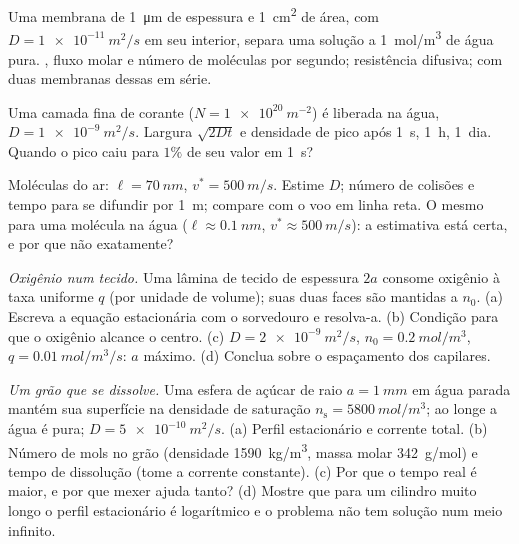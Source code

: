 \begin{exercise}[$\star$]\label{exo:b2:particle-diffusion:2}
Uma membrana de \qty{1}{\micro m} de espessura e \qty{1}{cm^2} de área, com $D =
\qty{1e-11}{m^2/s}$ em seu interior, separa uma solução a \qty{1}{mol/m^3}
de água pura. , fluxo molar e número de moléculas
por segundo; resistência difusiva; com duas membranas dessas em série.
\end{exercise}

\begin{exercise}[$\star$]\label{exo:b2:particle-diffusion:3}
Uma camada fina de corante ($N = \qty{1e20}{m^{-2}}$) é liberada na água,
$D = \qty{1e-9}{m^2/s}$. Largura $\sqrt{2Dt}$ e densidade de pico após
\qty{1}{s}, \qty{1}{h}, \qty{1}{dia}. Quando o pico caiu para
$1\%$ de seu valor em \qty{1}{s}?
\end{exercise}

\begin{exercise}[$\star$]\label{exo:b2:particle-diffusion:4}
Moléculas do ar: $\ell = \qty{70}{nm}$, $v^* = \qty{500}{m/s}$. Estime
$D$; número de colisões e tempo para se difundir por \qty{1}{m}; compare com
o voo em linha reta. O mesmo para uma molécula na água ($\ell \approx
\qty{0.1}{nm}$, $v^* \approx \qty{500}{m/s}$): a estimativa está certa, e
por que não exatamente?
\end{exercise}

\begin{exercise}[$\star\star$]\label{exo:b2:particle-diffusion:5}
\emph{Oxigênio num tecido.} Uma lâmina de tecido de espessura $2a$ consome
oxigênio à taxa uniforme $q$ (por unidade de volume); suas duas faces são
mantidas a $n_0$. (a) Escreva a equação estacionária com o sorvedouro e resolva-a.
(b) Condição para que o oxigênio alcance o centro. (c) $D = \qty{2e-9}{m^2/s}$,
$n_0 = \qty{0.2}{mol/m^3}$, $q = \qty{0.01}{mol/m^3/s}$: $a$ máximo. (d)
Conclua sobre o espaçamento dos capilares.
\end{exercise}

\begin{exercise}[$\star\star$]\label{exo:b2:particle-diffusion:6}
\emph{Um grão que se dissolve.} Uma esfera de açúcar de raio $a = \qty{1}{mm}$
em água parada mantém sua superfície na densidade de saturação $n_{\text{s}}
= \qty{5800}{mol/m^3}$; ao longe a água é pura; $D =
\qty{5e-10}{m^2/s}$. (a) Perfil estacionário e corrente total. (b)
Número de mols no grão (densidade \qty{1590}{kg/m^3}, massa molar
\qty{342}{g/mol}) e tempo de dissolução (tome a corrente constante).
(c) Por que o tempo real é maior, e por que mexer ajuda tanto?
(d) Mostre que para um cilindro muito longo o perfil estacionário é
logarítmico e o problema não tem solução num meio infinito.
\end{exercise}

